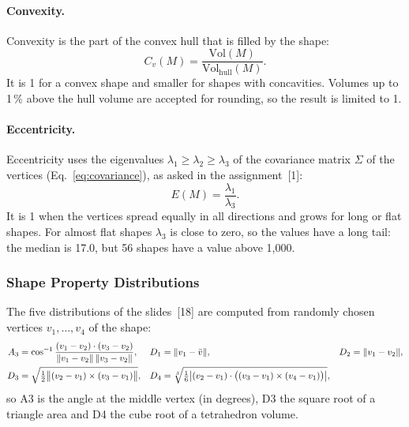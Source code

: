 \documentclass[10pt,a4paper]{article}
\begin{document}
\paragraph{Convexity.}
Convexity is the part of the convex hull that is filled by the shape:
\begin{equation}
C_v(M) = \frac{\mathrm{Vol}(M)}{\mathrm{Vol}_{\mathrm{hull}}(M)}.
\label{eq:s32_convexity}
\end{equation}
It is 1 for a convex shape and smaller for shapes with concavities. Volumes up to 1\,\% above the hull volume are accepted for
rounding, so the result is limited to 1.

\paragraph{Eccentricity.}
Eccentricity uses the eigenvalues $\lambda_1\ge\lambda_2\ge\lambda_3$ of the covariance matrix $\Sigma$ of the vertices
(Eq.~\eqref{eq:covariance}), as asked in the assignment~[1]:
\begin{equation}
E(M) = \frac{\lambda_1}{\lambda_3}.
\label{eq:s32_eccentricity}
\end{equation}
It is 1 when the vertices spread equally in all directions and grows for long or flat shapes. For almost flat shapes $\lambda_3$
is close to zero, so the values have a long tail: the median is 17.0, but 56 shapes have a value above 1,000.

\subsubsection{Shape Property Distributions}

The five distributions of the slides~[18] are computed from randomly chosen vertices $v_1,\ldots,v_4$ of the shape:
\begin{align}
A_3 &= \cos^{-1}\frac{(v_1-v_2)\cdot(v_3-v_2)}{\lVert v_1-v_2\rVert\,\lVert v_3-v_2\rVert}, &
D_1 &= \lVert v_1-\bar v\rVert, &
D_2 &= \lVert v_1-v_2\rVert, \label{eq:s32_distributions}\\
D_3 &= \sqrt{\tfrac12\big\lVert(v_2-v_1)\times(v_3-v_1)\big\rVert}, &
D_4 &= \sqrt[3]{\tfrac16\big|(v_2-v_1)\cdot\big((v_3-v_1)\times(v_4-v_1)\big)\big|}, \notag
\end{align}
so A3 is the angle at the middle vertex (in degrees), D3 the square root of a triangle area and D4 the cube root of a tetrahedron
volume.
\end{document}
